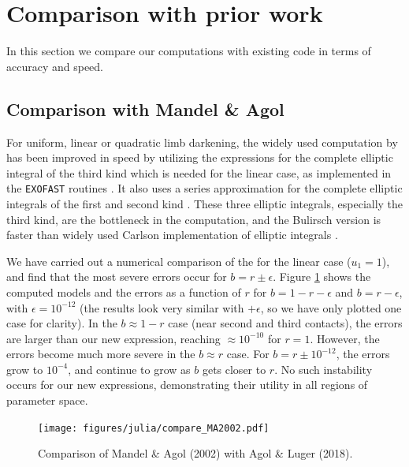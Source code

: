 \documentclass[modern]{aastex61}
\begin{document}
\section{Comparison with prior work} \label{sec:comparison}

In this section we compare our computations with existing code in terms
of accuracy and speed.

\subsection{Comparison with Mandel \& Agol}

For uniform, linear or quadratic limb darkening, the widely used computation
by \citet{MandelAgol2002} has been improved in speed by utilizing the
\citet{Bulirsch1965a,Bulirsch1965b} expressions for the complete elliptic
integral of the third kind which is needed for the linear case, as implemented
in the \texttt{EXOFAST} routines \citep{Eastman2013}.  It also uses a series 
approximation for the complete elliptic integrals of the first and second 
kind \citep{Hastings1955}. These three elliptic integrals, especially the third
kind, are the bottleneck in the computation, and the Bulirsch version is faster
than widely used Carlson implementation of elliptic integrals \citep{Carlson1979}.

We have carried out a numerical comparison of the \citet{MandelAgol2002}
for the linear case ($u_1=1$), and find that the most severe errors
occur for $b = r \pm \epsilon$.  Figure \ref{fig:compareMA} shows
the computed models and the errors as a function of $r$ for $b=1-r-\epsilon$
and $b=r-\epsilon$, with $\epsilon = 10^{-12}$ (the results look very
similar with $+\epsilon$, so we have only plotted one case for clarity).
In the $b\approx 1-r$ case (near second and third contacts), the errors
are larger than our new expression, reaching $\approx 10^{-10}$ for
$r = 1$.  However, the errors become much more severe in the $b \approx r$
case.  For $b=r \pm 10^{-12}$, the errors grow to $10^{-4}$, and continue
to grow as $b$ gets closer to $r$.  No such instability occurs for
our new expressions, demonstrating their utility in all regions of
parameter space.

\begin{figure}
    \begin{centering}
    \texttt{[image: figures/julia/compare\_MA2002.pdf]}
    \caption{Comparison of Mandel \& Agol (2002) with Agol \& Luger (2018).
    \label{fig:compareMA}}
    \end{centering}
\end{figure}
\end{document}
